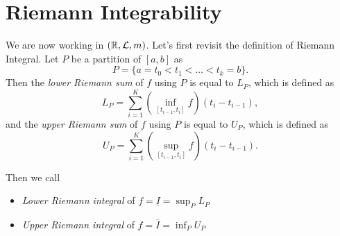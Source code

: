 \section{Riemann Integrability}
We are now working in \((\mathbb{\MakeUppercase{r}} , \mathcal{\MakeUppercase{l}} , m)\). Let's first revisit the definition of
Riemann Integral. Let \(P\) be a partition of \([a, b]\) as
\[
	P = \{a = t_0 < t_1 < \ldots < t_k = b \}.
\]
Then the \emph{lower Riemann sum} of \(f\) using \(P\) is equal to \(L_P\), which is defined as
\[
	L_{P} = \sum\limits_{i=1}^{K} \left(\inf _{[t_{i-1}, t_{i}]} f \right)(t_{i} - t_{i - 1}),
\]
and the \emph{upper Riemann sum} of \(f\) using \(P\) is equal to \(U_P\), which is defined as
\[
	U_{P} = \sum\limits_{i=1}^{K} \left(\sup _{[t_{i-1}, t_{i}]} f \right)(t_{i} - t_{i - 1}).
\]

Then we call
\begin{itemize}
	\item \emph{Lower Riemann integral} of \(f = \underline{I} = \sup_P L_{P} \)
	\item \emph{Upper Riemann integral} of \(f = \overline{I}  = \inf_P U_{P} \)
\end{itemize}

